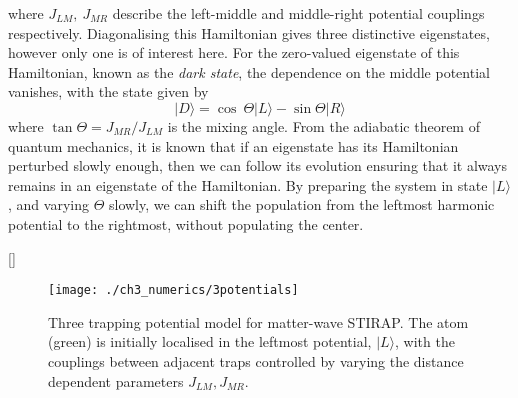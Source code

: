 where $J_{LM},~J_{MR}$ describe the left-middle and middle-right potential couplings respectively. Diagonalising this Hamiltonian gives three distinctive eigenstates, however only one is of interest here. For the zero-valued eigenstate of this Hamiltonian, known as the \textit{dark state}, the dependence on the middle potential vanishes, with the state given by
\begin{equation}
 | D \rangle = \cos\ \Theta| L \rangle - \sin \Theta | R \rangle
\end{equation}
where $\tan \Theta=J_{MR}/J_{LM}$ is the mixing angle. From the adiabatic theorem of quantum mechanics, it is known that if an eigenstate has its Hamiltonian perturbed slowly enough, then we can follow its evolution ensuring that it always remains in an eigenstate of the Hamiltonian. By preparing the system in state $| L \rangle$, and varying $\Theta$ slowly, we can shift the population from the leftmost harmonic potential to the rightmost, without populating the center.

 []


\begin{figure}
    \centering
    \texttt{[image: ./ch3\_numerics/3potentials]}
    \caption{Three trapping potential model for matter-wave STIRAP. The atom (green) is initially localised in the leftmost potential, $|L\rangle$, with the couplings between adjacent traps controlled by varying the distance dependent parameters $J_{LM},J_{MR}$.}
    \label{fig:ch3_stirap}
\end{figure}

